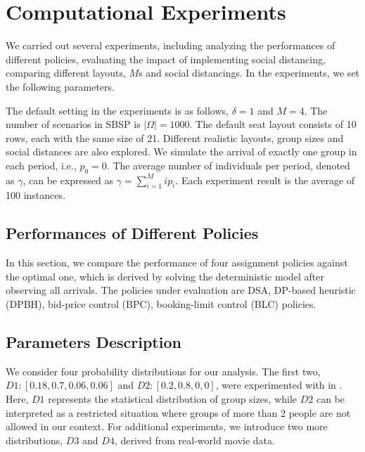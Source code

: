\section{Computational Experiments}\label{sec_result}
We carried out several experiments, including analyzing the performances of different policies, evaluating the impact of implementing social distancing, comparing different layouts, $M$s and social distancings. In the experiments, we set the following parameters. 

The default setting in the experiments is as follows, $\delta =1$ and $M =4$. The number of scenarios in SBSP is $|\Omega| = 1000$. The default seat layout consists of 10 rows, each with the same size of 21. Different realistic layouts, group sizes and social distances are also explored. We simulate the arrival of exactly one group in each period, i.e., $p_0 = 0$. The average number of individuals per period, denoted as $\gamma$, can be expressed as $\gamma = \sum_{i=1}^{M} i p_i$. Each experiment result is the average of 100 instances.

\subsection{Performances of Different Policies}
In this section, we compare the performance of four assignment policies against the optimal one, which is derived by solving the deterministic model after observing all arrivals. The policies under evaluation are DSA, DP-based heuristic (DPBH), bid-price control (BPC), booking-limit control (BLC) policies.

\subsection*{Parameters Description}
We consider four probability distributions for our analysis. The first two, $D1:[0.18,0.7,0.06,0.06]$ and $D2:[0.2,0.8,0,0]$, were experimented with in \cite{blom2022filling}. Here, $D1$ represents the statistical distribution of group sizes, while $D2$ can be interpreted as a restricted situation where groups of more than 2 people are not allowed in our context. For additional experiments, we introduce two more distributions, $D3$ and $D4$, derived from real-world movie data.

